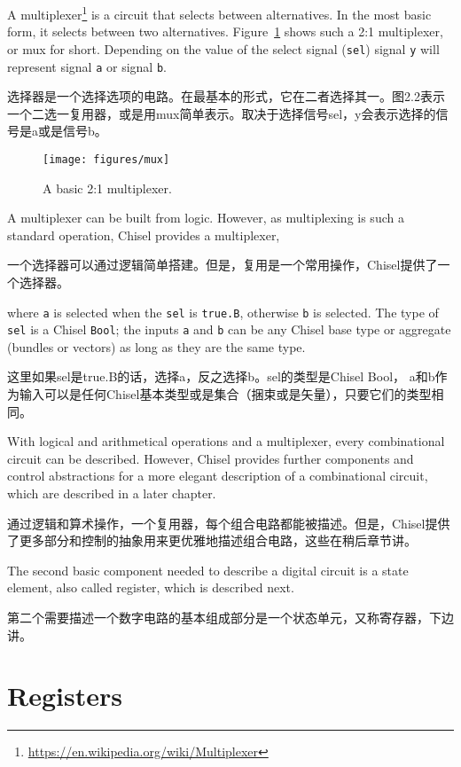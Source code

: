 \documentclass[%
    10pt,
    headinclude, footexclude,
    openright, %
    notitlepage,
    cleardoubleempty,
    headsepline,
    pointlessnumbers,
    bibtotoc, idxtotoc,
    ]{scrbook}
\newcommand{\code}[1]{{\small{\texttt{#1}}}}
\newcommand{\scale}{0.7}
\newcommand{\myref}[2]{\href{#1}{#2}}
\renewcommand{\myref}[2]{{#2}{\footnote{\url{#1}}}}
\begin{document}
A \myref{https://en.wikipedia.org/wiki/Multiplexer}{multiplexer} is a circuit that selects between alternatives.
In the most basic form, it selects between two alternatives. Figure~\ref{fig:mux} shows
such a 2:1 multiplexer, or mux for short. Depending on the value of the
select signal (\code{sel}) signal \code{y} will represent signal \code{a} or
signal \code{b}.

选择器是一个选择选项的电路。在最基本的形式，它在二者选择其一。图2.2表示一个二选一复用器，或是用mux简单表示。取决于选择信号sel，y会表示选择的信号是a或是信号b。


\begin{figure}
  \centering
  \texttt{[image: figures/mux]}
  \caption{A basic 2:1 multiplexer.}
  \label{fig:mux}
\end{figure}

A multiplexer can be built from logic.
However, as multiplexing  is such a standard operation, Chisel provides a multiplexer,

一个选择器可以通过逻辑简单搭建。但是，复用是一个常用操作，Chisel提供了一个选择器。


\noindent where \code{a} is selected when the \code{sel} is \code{true.B}, otherwise \code{b}
is selected. The type of \code{sel} is a Chisel \code{Bool}; the inputs \code{a} and \code{b}
can be any Chisel base type or aggregate (bundles or vectors) as long as they are the same
type.

这里如果sel是true.B的话，选择a，反之选择b。sel的类型是Chisel Bool， a和b作为输入可以是任何Chisel基本类型或是集合（捆束或是矢量），只要它们的类型相同。

With logical and arithmetical operations and a multiplexer, every combinational
circuit can be described. However, Chisel provides further components and control abstractions
for a more elegant description of a combinational circuit, which are described in
a later chapter.

通过逻辑和算术操作，一个复用器，每个组合电路都能被描述。但是，Chisel提供了更多部分和控制的抽象用来更优雅地描述组合电路，这些在稍后章节讲。


The second basic component needed to describe a digital circuit is a state element,
also called register, which is described next.

第二个需要描述一个数字电路的基本组成部分是一个状态单元，又称寄存器，下边讲。

\section{Registers}
\end{document}
